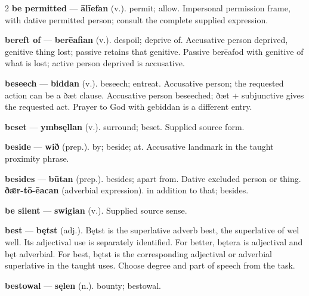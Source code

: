 \begin{multicols}{2}
\textbf{be permitted} — \textbf{ālīefan} (v.). permit; allow. Impersonal permission frame, with dative permitted person; consult the complete supplied expression.\par
\textbf{bereft of} — \textbf{berēafian} (v.). despoil; deprive of. Accusative person deprived, genitive thing lost; passive retains that genitive. Passive berēafod with genitive of what is lost; active person deprived is accusative.\par
\textbf{beseech} — \textbf{biddan} (v.). beseech; entreat. Accusative person; the requested action can be a ðæt clause. Accusative person beseeched; ðæt + subjunctive gives the requested act. Prayer to God with gebiddan is a different entry.\par
\textbf{beset} — \textbf{ymbsęllan} (v.). surround; beset. Supplied source form.\par
\textbf{beside} — \textbf{wið} (prep.). by; beside; at. Accusative landmark in the taught proximity phrase.\par
\textbf{besides} — \textbf{būtan} (prep.). besides; apart from. Dative excluded person or thing. \textbf{ðǣr-tō-ēacan} (adverbial expression). in addition to that; besides.\par
\textbf{be silent} — \textbf{swigian} (v.). Supplied source sense.\par
\textbf{best} — \textbf{bętst} (adj.).  Bętst is the superlative adverb best, the superlative of wel well. Its adjectival use is separately identified. For better, bętera is adjectival and bęt adverbial. For best, bętst is the corresponding adjectival or adverbial superlative in the taught uses. Choose degree and part of speech from the task.\par
\textbf{bestowal} — \textbf{sęlen} (n.). bounty; bestowal.\par

\end{multicols}
